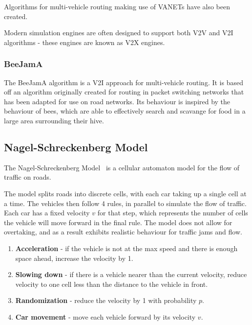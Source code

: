 \documentclass[ %
                    author={Alexander Hill},
                supervisor={Dr. Benjamin Sach},
                    degree={MEng},
                     title={MARMOSET},
                  subtitle={Multi-Agent Route Management using Online Simulation for Efficient Transportation},
                      type={research},
                      year={2016} ]{dissertation}
\begin{document}
Algorithms for multi-vehicle routing making use of VANETs have also been
created.

Modern simulation engines are often designed to support both V2V and V2I
algorithms - these engines are known as V2X engines.

\subsubsection{BeeJamA}

The BeeJamA algorithm is a V2I approach for multi-vehicle routing. It is based
off an algorithm originally created for routing in packet switching networks
that has been adapted for use on road networks. Its behaviour is inspired by the
behaviour of bees, which are able to effectively search and scavange for food in
a large area surrounding their hive.



\subsection{Nagel-Schreckenberg Model} \label{sec:nagel}

The Nagel-Schreckenberg Model~\cite{nagel} is a cellular automaton model for the
flow of traffic on roads.

The model splits roads into discrete cells, with each car taking up a single
cell at a time. The vehicles then follow 4 rules, in parallel to simulate the
flow of traffic. Each car has a fixed velocity $v$ for that step, which
represents the number of cells the vehicle will move forward in the final rule.
The model does not allow for overtaking, and as a result exhibits realistic
behaviour for traffic jams and flow.

\begin{enumerate}
    \item \textbf{Acceleration} - if the vehicle is not at the max speed and
        there is enough space ahead, increase the velocity by 1.
    \item \textbf{Slowing down} - if there is a vehicle nearer than the current
        velocity, reduce velocity to one cell less than the distance to the
        vehicle in front.
    \item \textbf{Randomization} - reduce the velocity by 1 with probability
        $p$.
    \item \textbf{Car movement} - move each vehicle forward by its velocity $v$.
\end{enumerate}
\end{document}
